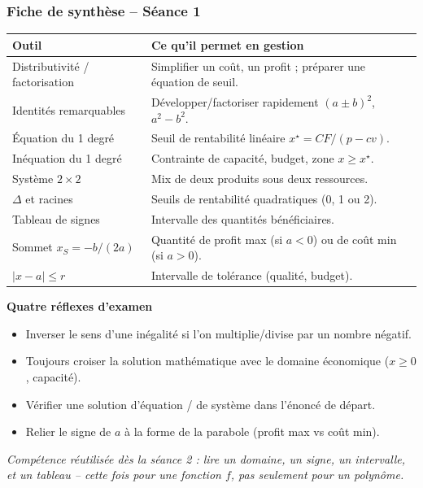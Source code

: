 \documentclass[12pt,a4paper]{article}
\renewcommand{\arraystretch}{1.25}
\begin{document}
\subsubsection*{Fiche de synthèse -- Séance 1}

\begin{center}
\renewcommand{\arraystretch}{1.2}
\begin{tabular}{p{}p{}}
\toprule
\textbf{Outil} & \textbf{Ce qu'il permet en gestion} \\
\midrule
Distributivité / factorisation & Simplifier un coût, un profit ; préparer une équation de seuil. \\
Identités remarquables & Développer/factoriser rapidement $(a\pm b)^2$, $a^2-b^2$. \\
Équation du 1\up{er} degré & Seuil de rentabilité linéaire $x^\star=CF/(p-cv)$. \\
Inéquation du 1\up{er} degré & Contrainte de capacité, budget, zone $x\geqslant x^\star$. \\
Système $2\times 2$ & Mix de deux produits sous deux ressources. \\
$\Delta$ et racines & Seuils de rentabilité quadratiques (0, 1 ou 2). \\
Tableau de signes & Intervalle des quantités bénéficiaires. \\
Sommet $x_S=-b/(2a)$ & Quantité de profit max (si $a<0$) ou de coût min (si $a>0$). \\
$|x-a|\leqslant r$ & Intervalle de tolérance (qualité, budget). \\
\bottomrule
\end{tabular}
\end{center}

\vspace{0.3cm}
\textbf{Quatre réflexes d'examen}
\begin{itemize}[leftmargin=1.2cm]
  \item Inverser le sens d'une inégalité si l'on multiplie/divise par un nombre négatif.
  \item Toujours croiser la solution mathématique avec le domaine économique ($x\geqslant 0$, capacité).
  \item Vérifier une solution d'équation / de système dans l'énoncé de départ.
  \item Relier le signe de $a$ à la forme de la parabole (profit max vs coût min).
\end{itemize}

\vspace{0.2cm}
{\small\color{mundigray}\textit{Compétence réutilisée dès la séance 2 : lire un domaine, un signe, un intervalle, et un tableau -- cette fois pour une fonction $f$, pas seulement pour un polynôme. }}
\end{document}
